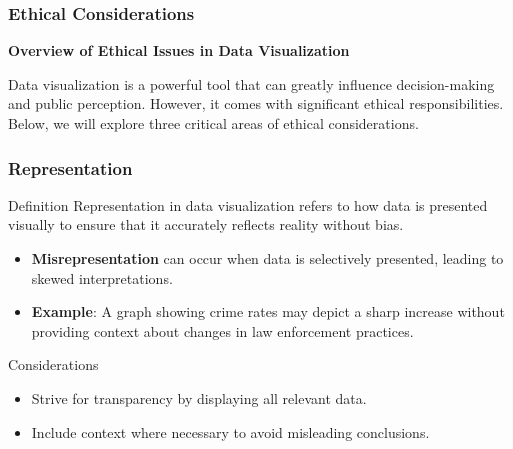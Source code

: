 \documentclass[aspectratio=169]{beamer}
\begin{document}
\begin{frame}[fragile]
    \frametitle{Ethical Considerations}
    \textbf{Overview of Ethical Issues in Data Visualization}
    
    Data visualization is a powerful tool that can greatly influence decision-making and public perception. However, it comes with significant ethical responsibilities. Below, we will explore three critical areas of ethical considerations.
\end{frame}

\begin{frame}[fragile]
    \frametitle{Representation}
    
    \begin{block}{Definition}
        Representation in data visualization refers to how data is presented visually to ensure that it accurately reflects reality without bias.
    \end{block}
    
    \begin{itemize}
        \item \textbf{Misrepresentation} can occur when data is selectively presented, leading to skewed interpretations.
        \item \textbf{Example}: A graph showing crime rates may depict a sharp increase without providing context about changes in law enforcement practices.
    \end{itemize}
    
    \begin{block}{Considerations}
        \begin{itemize}
            \item Strive for transparency by displaying all relevant data.
            \item Include context where necessary to avoid misleading conclusions.
        \end{itemize}
    \end{block}
\end{frame}
\end{document}
